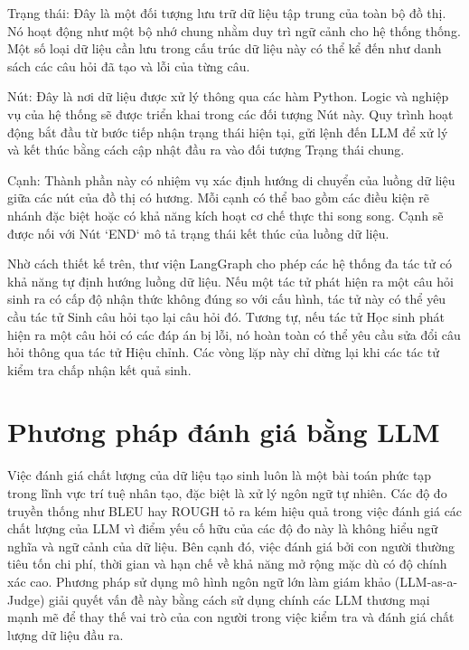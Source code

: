 Trạng thái: Đây là một đối tượng lưu trữ dữ liệu tập trung của toàn bộ đồ thị. Nó hoạt động như một bộ nhớ chung nhằm duy trì ngữ cảnh cho hệ thống thống. Một số loại dữ liệu cần lưu trong cấu trúc dữ liệu này có thể kể đến như danh sách các câu hỏi đã tạo và lỗi của từng câu.

Nút: Đây là nơi dữ liệu được xử lý thông qua các hàm Python. Logic và nghiệp vụ của hệ thống sẽ được triển khai trong các đối tượng Nút này. Quy trình hoạt động bắt đầu từ bước tiếp nhận trạng thái hiện tại, gửi lệnh đến LLM để xử lý và kết thúc bằng cách cập nhật đầu ra vào đối tượng Trạng thái chung.

Cạnh: Thành phần này có nhiệm vụ xác định hướng di chuyển của luồng dữ liệu giữa các nút của đồ thị có hương. Mỗi cạnh có thể bao gồm các điều kiện rẽ nhánh đặc biệt hoặc có khả năng kích hoạt cơ chế thực thi song song. Cạnh sẽ được nối với Nút `END` mô tả trạng thái kết thúc của luồng dữ liệu.

Nhờ cách thiết kế trên, thư viện LangGraph cho phép các hệ thống đa tác tử có khả năng tự định hướng luồng dữ liệu. Nếu một tác tử  phát hiện ra một câu hỏi sinh ra có cấp độ nhận thức không đúng so với cấu hình, tác tử này có thể yêu cầu tác tử {Sinh câu hỏi} tạo lại câu hỏi đó. Tương tự, nếu tác tử {Học sinh} phát hiện ra một câu hỏi có các đáp án bị lỗi, nó hoàn toàn có thể yêu cầu sửa đổi câu hỏi thông qua tác tử {Hiệu chỉnh}. Các vòng lặp này chỉ dừng lại khi các tác tử kiểm tra chấp nhận kết quả sinh.

\section{Phương pháp đánh giá bằng LLM}

Việc đánh giá chất lượng của dữ liệu tạo sinh luôn là một bài toán phức tạp trong lĩnh vực trí tuệ nhân tạo, đặc biệt là xử lý ngôn ngữ tự nhiên. Các độ đo truyền thống như BLEU hay ROUGH tỏ ra kém hiệu quả trong việc đánh giá các chất lượng của LLM vì điểm yếu cố hữu của các độ đo này là không hiểu ngữ nghĩa và ngữ cảnh của dữ liệu. Bên cạnh đó, việc đánh giá bởi con người thường tiêu tốn chi phí, thời gian và hạn chế về khả năng mở rộng mặc dù có độ chính xác cao. Phương pháp sử dụng mô hình ngôn ngữ lớn làm giám khảo (LLM-as-a-Judge) giải quyết vấn đề này bằng cách sử dụng chính các LLM thương mại mạnh mẽ để thay thế vai trò của con người trong việc kiểm tra và đánh giá chất lượng dữ liệu đầu ra.

